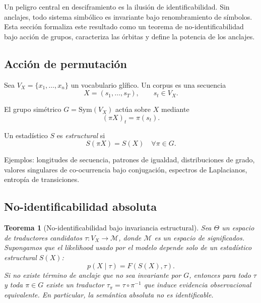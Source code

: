 \documentclass[11pt,a4paper]{article}
\newtheorem{theorem}{Teorema}[section]
\newcommand{\1}{\mathbf{1}}
\numberwithin{equation}{section}
\begin{document}
Un peligro central en desciframiento es la ilusión de identificabilidad. Sin anclajes, todo sistema simbólico es invariante bajo renombramiento de símbolos. Esta sección formaliza este resultado como un teorema de no-identificabilidad bajo acción de grupos, caracteriza las órbitas y define la potencia de los anclajes.

\subsection{Acción de permutación}

Sea $V_X=\{x_1,\dots,x_n\}$ un vocabulario glífico. Un corpus es una secuencia
\begin{equation}
    X=(s_1,\dots,s_T), \qquad s_t\in V_X.
\end{equation}

El grupo simétrico $G=\mathrm{Sym}(V_X)$ actúa sobre $X$ mediante
\begin{equation}
    (\pi X)_t = \pi(s_t).
\end{equation}

Un estadístico $S$ es \emph{estructural} si
\begin{equation}
    S(\pi X)=S(X) \quad\forall \pi\in G.
\end{equation}

Ejemplos: longitudes de secuencia, patrones de igualdad, distribuciones de grado, valores singulares de co-ocurrencia bajo conjugación, espectros de Laplacianos, entropía de transiciones.

\subsection{No-identificabilidad absoluta}

\begin{theorem}[No-identificabilidad bajo invariancia estructural]
\label{thm:nofd_group}
Sea $\Theta$ un espacio de traductores candidatos $\tau:V_X\to\mathcal{M}$, donde $\mathcal{M}$ es un espacio de significados. Supongamos que el likelihood usado por el modelo depende solo de un estadístico estructural $S(X)$:
\begin{equation}
    p(X\mid\tau)=F(S(X),\tau).
\end{equation}
Si no existe término de anclaje que no sea invariante por $G$, entonces para todo $\tau$ y toda $\pi\in G$ existe un traductor $\tau_\pi=\tau\circ\pi^{-1}$ que induce evidencia observacional equivalente. En particular, la semántica absoluta no es identificable.
\end{theorem}
\end{document}
